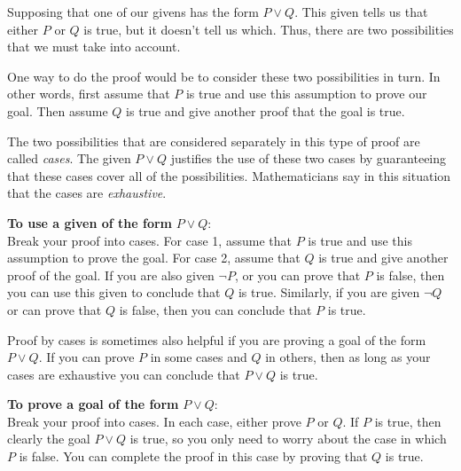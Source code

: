 Supposing that one of our givens has the form $P \lor Q$. This given tells us that either $P$ or $Q$ is true, but it doesn't tell us which. Thus, there are two possibilities that we must take into account.

One way to do the proof would be to consider these two possibilities in turn. In other words, first assume that $P$ is true and use this assumption to prove our goal. Then assume $Q$ is true and give another proof that the goal is true.

The two possibilities that are considered separately in this type of proof are called \textit{cases}. The given $P \lor Q$ justifies the use of these two cases by guaranteeing that these cases cover all of the possibilities. Mathematicians say in this situation that the cases are \textit{exhaustive}.

\textbf{To use a given of the form} $P \lor Q$:\\
Break your proof into cases. For case 1, assume that $P$ is true and use this assumption to prove the goal. For case 2, assume that $Q$ is true and give another proof of the goal.
If you are also given $\lnot P$, or you can prove that $P$ is false, then you can use this given to conclude that $Q$ is true. Similarly, if you are given $\lnot Q$ or can prove that $Q$ is false, then you can conclude that $P$ is true.

Proof by cases is sometimes also helpful if you are proving a goal of the form $P \lor Q$. If you can prove $P$ in some cases and $Q$ in others, then as long as your cases are exhaustive you can conclude that $P \lor Q$ is true.

\textbf{To prove a goal of the form} $P \lor Q$:\\
Break your proof into cases. In each case, either prove $P$ or $Q$.
If $P$ is true, then clearly the goal $P \lor Q$ is true, so you only need to worry about the case in which $P$ is false. You can complete the proof in this case by proving that $Q$ is true.
